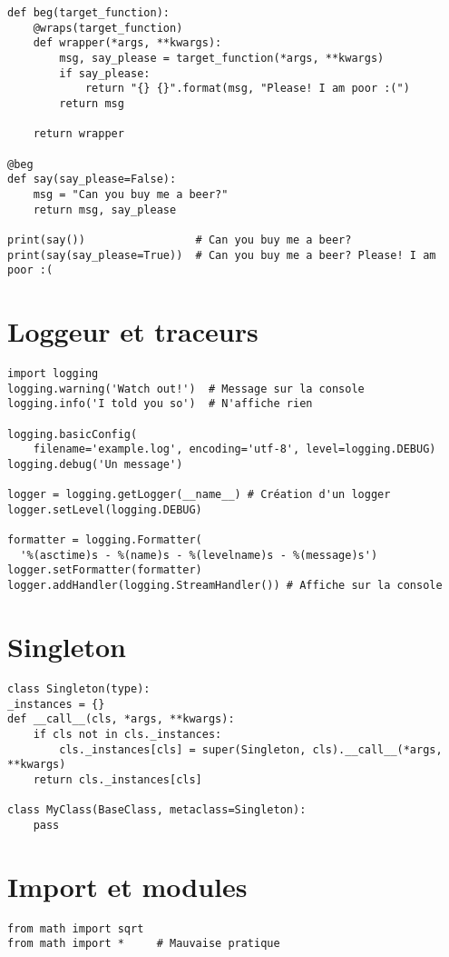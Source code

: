 \documentclass{article}
\begin{document}
\begin{multicols*}{4}
\begin{lstlisting}
def beg(target_function):
    @wraps(target_function)
    def wrapper(*args, **kwargs):
        msg, say_please = target_function(*args, **kwargs)
        if say_please:
            return "{} {}".format(msg, "Please! I am poor :(")
        return msg

    return wrapper

@beg
def say(say_please=False):
    msg = "Can you buy me a beer?"
    return msg, say_please

print(say())                 # Can you buy me a beer?
print(say(say_please=True))  # Can you buy me a beer? Please! I am poor :(
\end{lstlisting}

\section*{Loggeur et traceurs}
\begin{lstlisting}
import logging
logging.warning('Watch out!')  # Message sur la console
logging.info('I told you so')  # N'affiche rien 

logging.basicConfig(
    filename='example.log', encoding='utf-8', level=logging.DEBUG)
logging.debug('Un message')

logger = logging.getLogger(__name__) # Création d'un logger
logger.setLevel(logging.DEBUG) 

formatter = logging.Formatter(
  '%(asctime)s - %(name)s - %(levelname)s - %(message)s')
logger.setFormatter(formatter)
logger.addHandler(logging.StreamHandler()) # Affiche sur la console

\end{lstlisting}

\section*{Singleton}
\begin{lstlisting}
class Singleton(type):
_instances = {}
def __call__(cls, *args, **kwargs):
    if cls not in cls._instances:
        cls._instances[cls] = super(Singleton, cls).__call__(*args, **kwargs)
    return cls._instances[cls]

class MyClass(BaseClass, metaclass=Singleton):
    pass
\end{lstlisting}

\section*{Import et modules}
\begin{lstlisting}
from math import sqrt 
from math import *     # Mauvaise pratique


\end{lstlisting}
\end{multicols*}
\end{document}
